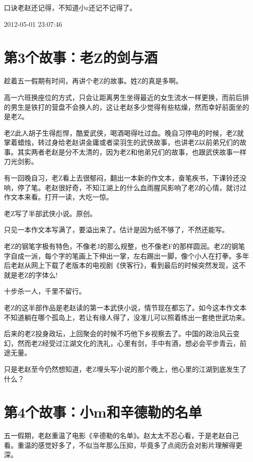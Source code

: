 \documentclass[openany]{ctexbook}
\begin{document}
口诀老赵还记得，不知道小z还记不记得了。

2012-05-01 23:07:46

\chapter*{第3个故事：老Z的剑与酒}\label{z3}

趁着五一假期有时间，再讲个老Z的故事。姓Z的真是多啊。

高一六班换座位的方式，只会让距离男生坐得最近的女生流水一样更换，而前后排的男生是铁打的营盘不会换人的，这让老赵多少觉得有些枯燥，然而幸好前面坐的是老Z。

老Z此人胡子生得彪悍，酷爱武侠，喝酒喝得吐过血。晚自习停电的时候，老Z就掌着蜡烛，转过身给老赵讲金庸或者梁羽生的武侠故事，也讲老Z以前弟兄们的故事。其实两者老赵是分不太清的，因为老Z和他弟兄们的故事，也跟武侠故事一样刀光剑影。

有一回晚自习，老Z看上去很郁闷，翻出一本新的作文本，奋笔疾书，下课铃还没响，停了笔。老赵很好奇，不知江湖上的什么血雨腥风影响了老Z的心情，就讨过作文本来看。打开一读，大吃一惊。

老Z写了半部武侠小说。原创。

只见一本作文本写满了，要溢出来了。估计是因为纸不够了，不然还能写。

老Z的钢笔字极有特色，不像老J的那么规整，也不像老F的那样圆润。老Z的钢笔字自成一派，每个字的笔画上下伸出一掌，左右踢出一脚，像个小人在打拳。多年后老赵从网上下载了老版本的电视剧《侠客行》，看到最后的时候突然发现，这不就是老Z的字体么!

十步杀一人，千里不留行。

老Z的这半部作品是老赵读的第一本武侠小说，情节现在都忘了。如今这本作文本不知道躺在哪个孤岛上，若让有缘人得了，没准儿可以照着练出一套绝世武功来。

后来的老Z投身政坛，上回聚会的时候不巧他下乡视察去了。中国的政治风云变幻，然而老Z经受过江湖文化的洗礼，心里有剑，手中有酒，想必会平步青云，前途无量。

只是老赵至今仍然想知道，老Z埋头写小说的那个晚上，他心里的江湖到底发生了什么？

\chapter*{第4个故事：小m和辛德勒的名单}\label{m4}

五一假期，老赵重温了电影《辛德勒的名单》。赵太太不忍心看，于是老赵自己看。重温的感觉好多了，不似当年那么压抑，毕竟多了点阅历会对影片理解得更深。
\end{document}

